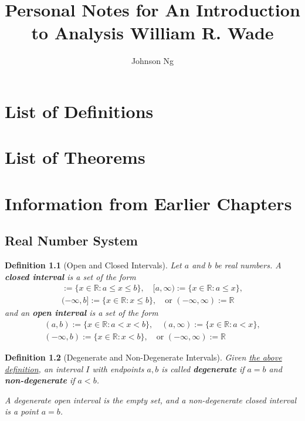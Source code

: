 \documentclass[11pt, oneside]{book}
\title{Personal Notes for An Introduction to Analysis William R. Wade}
\author{Johnson Ng}
\theoremstyle{break}
\newtheorem{defn}{Definition}[section]
\newcommand{\bb}[1]{\mathbb{#1}}			%
\begin{document}
\hypersetup{pageanchor=false}
\maketitle
\hypersetup{pageanchor=true}

\tableofcontents

\chapter*{List of Definitions}

\chapter*{List of Theorems}

\chapter{Information from Earlier Chapters}\label{chp:important theorems and definitions}

\section{Real Number System}\label{sect:Real Number System}

\begin{defn}[Open and Closed Intervals]\label{defn:Open and Closed Intervals}
    Let $a$ and $b$ be real numbers. A \textbf{closed interval} is a set of the form
    \begin{gather*}
        [a, b] := \{ x \in \bb{R} : a \leq x \leq b \}, \quad [a, \infty) := \{ x \in \bb{R} : a \leq x \}, \\
        (-\infty, b] := \{ x \in \bb{R} : x \leq b \}, \quad \text{or } (-\infty, \infty) := \bb{R}
    \end{gather*}
    and an \textbf{open interval} is a set of the form
    \begin{gather*}
        (a, b) := \{ x \in \bb{R} : a < x < b \}, \quad (a, \infty) := \{ x \in \bb{R} : a < x \}, \\
        (-\infty, b) := \{ x \in \bb{R} : x < b \}, \quad \text{or } (-\infty, \infty) := \bb{R}
    \end{gather*}
\end{defn}

\begin{defn}[Degenerate and Non-Degenerate Intervals]\label{defn:Degenerate and Non-Degenerate}
    Given \hyperref[defn:Open and Closed Intervals]{the above definition}, an interval $I$ with endpoints $a, b$ is called \textbf{degenerate} if $a = b$ and \textbf{non-degenerate} if $a < b$.

    A degenerate open interval is the empty set, and a non-degenerate closed interval is a point $a = b$.
\end{defn}
\end{document}
